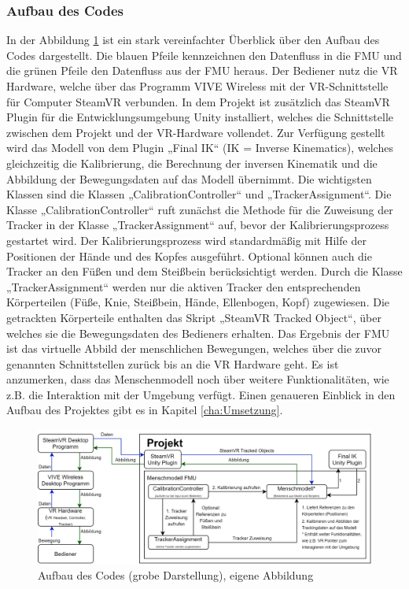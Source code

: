 \subsubsection{Aufbau des Codes}\label{sec:CCode}
In der Abbildung \ref{fig:CodeDarstellung} ist ein stark vereinfachter Überblick über den Aufbau des Codes dargestellt. Die blauen Pfeile kennzeichnen den Datenfluss in die FMU und die grünen Pfeile den Datenfluss aus der FMU heraus. Der Bediener nutz die VR Hardware, welche über das Programm VIVE Wireless mit der VR-Schnittstelle für Computer SteamVR verbunden. In dem Projekt ist zusätzlich das SteamVR Plugin für die Entwicklungsumgebung Unity installiert, welches die Schnittstelle zwischen dem Projekt und der VR-Hardware vollendet. Zur Verfügung gestellt wird das Modell von dem Plugin „Final IK“ (IK = Inverse Kinematics), welches gleichzeitig die Kalibrierung, die Berechnung der inversen Kinematik und die Abbildung der Bewegungsdaten auf das Modell übernimmt. Die wichtigsten Klassen sind die Klassen „CalibrationController“ und „TrackerAssignment“. Die Klasse „CalibrationController“ ruft zunächst die Methode für die Zuweisung der Tracker in der Klasse „TrackerAssignment“ auf, bevor der Kalibrierungsprozess gestartet wird. Der Kalibrierungsprozess wird standardmäßig mit Hilfe der Positionen der Hände und des Kopfes ausgeführt. Optional können auch die Tracker an den Füßen und dem Steißbein berücksichtigt werden. Durch die Klasse „TrackerAssignment“ werden nur die aktiven Tracker den entsprechenden Körperteilen (Füße, Knie, Steißbein, Hände, Ellenbogen, Kopf) zugewiesen. Die getrackten Körperteile enthalten das Skript „SteamVR Tracked Object“, über welches sie die Bewegungsdaten des Bedieners erhalten. Das Ergebnis der FMU ist das virtuelle Abbild der menschlichen Bewegungen, welches über die zuvor genannten Schnittstellen zurück bis an die VR Hardware geht. Es ist anzumerken, dass das Menschenmodell noch über weitere Funktionalitäten, wie z.B. die Interaktion mit der Umgebung verfügt. Einen genaueren Einblick in den Aufbau des Projektes gibt es in Kapitel \ref{cha:Umsetzung}.
\begin{figure}[h]
	\centering
	\includegraphics[width=0.9\linewidth]{Bilder/A25_CodeDarstellung}
	\caption{Aufbau des Codes (grobe Darstellung), eigene Abbildung}
	\label{fig:CodeDarstellung}
\end{figure}

